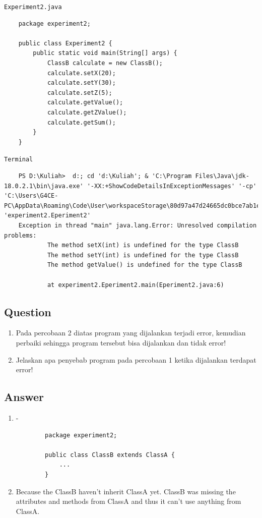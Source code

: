 \documentclass[12pt,titlepage]{article}
\begin{document}
\newpage
\texttt{Experiment2.java}
\begin{verbatim}
    package experiment2;

    public class Experiment2 {
        public static void main(String[] args) {
            ClassB calculate = new ClassB();
            calculate.setX(20);
            calculate.setY(30);
            calculate.setZ(5);
            calculate.getValue();
            calculate.getZValue();
            calculate.getSum();
        }
    }
\end{verbatim}
\texttt{Terminal}
\begin{verbatim}
    PS D:\Kuliah>  d:; cd 'd:\Kuliah'; & 'C:\Program Files\Java\jdk-18.0.2.1\bin\java.exe' '-XX:+ShowCodeDetailsInExceptionMessages' '-cp' 'C:\Users\G4CE-PC\AppData\Roaming\Code\User\workspaceStorage\80d97a47d24665dc0bce7ab1e048ecbd\redhat.java\jdt_ws\Kuliah_28156aa7\bin' 'experiment2.Eperiment2'
    Exception in thread "main" java.lang.Error: Unresolved compilation problems: 
            The method setX(int) is undefined for the type ClassB
            The method setY(int) is undefined for the type ClassB
            The method getValue() is undefined for the type ClassB

            at experiment2.Eperiment2.main(Eperiment2.java:6)
\end{verbatim}

\newpage
\subsection{Question}
\begin{enumerate}
    \item Pada percobaan 2 diatas program yang dijalankan terjadi error, kemudian perbaiki sehingga program tersebut bisa dijalankan dan tidak error!
    \item Jelaskan apa penyebab program pada percobaan 1 ketika dijalankan terdapat error!
\end{enumerate}

\subsection{Answer}
\begin{enumerate}
    \item -
    \begin{verbatim}
        package experiment2;
    
        public class ClassB extends ClassA {
            ...
        }
    \end{verbatim}
    \item Because the ClassB haven't inherit ClassA yet. ClassB was missing the attributes and methods from ClassA and thus it can't use anything from ClassA.
\end{enumerate}
\end{document}
